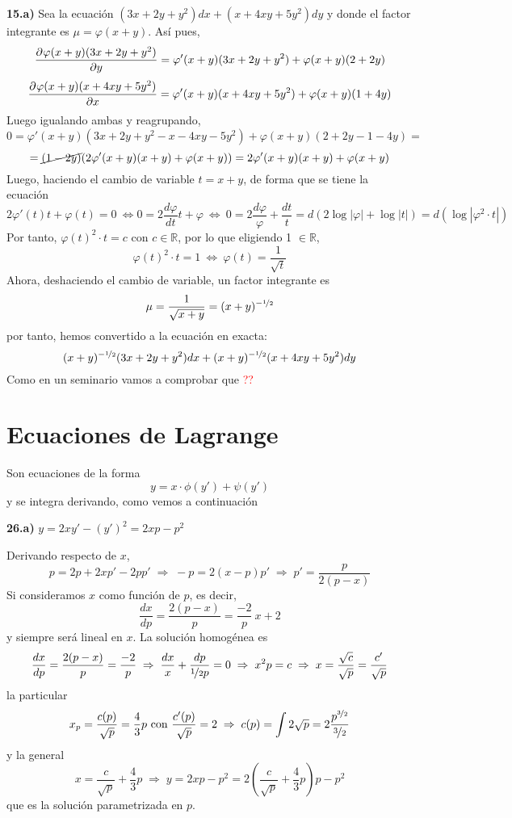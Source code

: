 \begin{ejer} \textbf{15.a)}
    Sea la ecuación $(3x+2y+y^2) dx + (x+4xy+5y^2) dy$ y donde el factor integrante es $\mu=\varphi(x+y)$. Así pues,
    $$\frac{\partial^{} \varphi(x+y)(3x+2y+y^2)}{\partial y}=\varphi'(x+y)(3x+2y+y^2)+\varphi(x+y)(2+2y)$$
    $$\frac{\partial^{} \varphi(x+y)(x+4xy+5y^2)}{\partial x}=\varphi'(x+y)(x+4xy+5y^2)+\varphi(x+y)(1+4y)$$
    Luego igualando ambas y reagrupando,
    $$0=\varphi'(x+y)(3x+2y+y^2-x-4xy-5y^2)+\varphi(x+y)(2+2y-1-4y)=$$
    $$=\cancel{(1-2y)}(2\varphi'(x+y)(x+y)+\varphi(x+y))=2\varphi'(x+y)(x+y)+\varphi(x+y)$$
    Luego, haciendo el cambio de variable $t=x+y$, de forma que se tiene la ecuación
    $$2\varphi'(t)t+\varphi(t)=0 \: \iff 0=2 \dfrac{d\varphi}{dt}t +\varphi \: \iff \: 0=2\dfrac{d\varphi}{\varphi}+\dfrac{dt}{t}=d\left(2\log|\varphi|+\log|t|\right)=d(\log|\varphi^2 \cdot t |)$$
    Por tanto, $\varphi(t)^2\cdot t=c$ con $c \in \mathbb R$, por lo que eligiendo 1 $\in \mathbb R$, 
    $$\varphi(t)^2\cdot t=1 \: \iff \: \varphi(t)=\dfrac{1}{\sqrt{t}}$$
    Ahora, deshaciendo el cambio de variable, un factor integrante es 
    $$\mu=\dfrac{1}{\sqrt{x+y}}=(x+y)^{-\nicefrac{1}{2}}$$
    por tanto, hemos convertido a la ecuación en exacta:
    $$(x+y)^{-\nicefrac{1}{2}}(3x+2y+y^2) dx + (x+y)^{-\nicefrac{1}{2}}(x+4xy+5y^2) dy$$
    Como en un seminario vamos a comprobar que \textcolor{red}{??}
\end{ejer}
\section{Ecuaciones de Lagrange}

Son ecuaciones de la forma 
$$y=x\cdot \phi(y')+\psi(y')$$
y se integra derivando, como vemos a continuación
\begin{ejer} 
\textbf{26.a)} $y=2xy'-(y')^2=2xp-p^2$
\end{ejer}
\begin{sol}
    Derivando respecto de $x$,
    $$p=2p+2xp'-2pp' \; \Rightarrow \; -p=2(x-p)p' \; \Rightarrow \; p'=\dfrac{p}{2(p-x)}$$
    Si consideramos $x$ como función de $p$, es decir, 
    $$\dfrac{dx}{dp}=\dfrac{2(p-x)}{p}=\dfrac{-2}{p}\: x+2$$
    y siempre será lineal en $x$. 
    La solución homogénea es
    $$\dfrac{dx}{dp}=\dfrac{2(p-x)}{p}=\dfrac{-2}{p} \; \Rightarrow \; \dfrac{dx}{x}+\dfrac{dp}{\nicefrac{1}{2}p}=0 \; \Rightarrow \; x^2 p = c \; \Rightarrow \; x=\dfrac{\sqrt{c}}{\sqrt{p}}=\dfrac{c'}{\sqrt{p}}$$
    la particular
    $$x_p=\dfrac{c(p)}{\sqrt{p}}=\dfrac{4}{3} p \text{ con } \dfrac{c'(p)}{\sqrt{p}}=2 \; \Rightarrow \; c(p)= \int 2 \sqrt{p}=2 \dfrac{p^{\nicefrac{3}{2}}}{\nicefrac{3}{2}}$$
    y la general
    $$x=\dfrac{c}{\sqrt{p}}+\dfrac{4}{3}p \; \Rightarrow \; y=2xp-p^2 = 2 \left(\dfrac{c}{\sqrt{p}}+\dfrac{4}{3}p \right)p-p^2$$
    que es la solución parametrizada en $p$.
    \end{sol}
